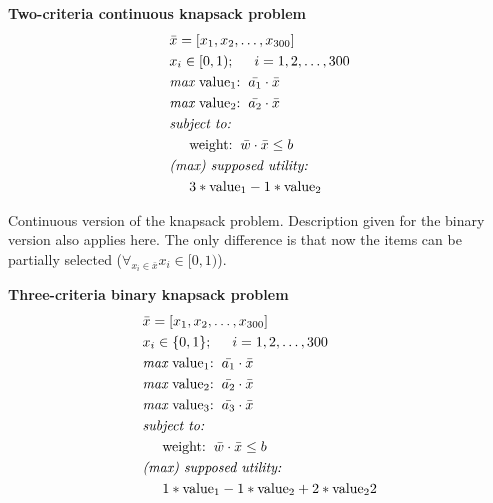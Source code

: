 \begin{description}
  \item{\textbf{Two-criteria continuous knapsack problem}}
    \begin{align*}
      & \bar{x} = [x_1, x_2, \dots, x_{300}]  \\
      & x_i \in [0, 1);  \hspace{0.5cm} i = 1, 2, \dots, 300 \\
      & \textit{max}\text{ value$_1$:} \hspace{0.2cm} \bar{a_1} \cdot \bar{x} \\
      & \textit{max}\text{ value$_2$:} \hspace{0.2cm} \bar{a_2} \cdot \bar{x} \\
      & \textit{subject to:} \\
      & \hspace{0.5cm} \text{weight:}  \hspace{0.2cm} \bar{w} \cdot \bar{x}
        \leq b \\
      & \textit{(max) supposed utility:} \\
      & \hspace{0.5cm} 3 * \text{value}_1 - 1 * \text{value}_2
    \end{align*}

    Continuous version of the knapsack problem. Description given for the
    binary version also applies here. The only difference is that now the
    items can be partially selected ($\forall_{x_i \in \bar{x}} x_i \in [0,
      1)$).

  \item{\textbf{Three-criteria binary knapsack problem}}
    \begin{align*}
      & \bar{x} = [x_1, x_2, \dots, x_{300}]  \\
      & x_i \in \{0, 1\};  \hspace{0.5cm} i = 1, 2, \dots, 300 \\
      & \textit{max}\text{ value$_1$:} \hspace{0.2cm} \bar{a_1} \cdot \bar{x} \\
      & \textit{max}\text{ value$_2$:} \hspace{0.2cm} \bar{a_2} \cdot \bar{x} \\
      & \textit{max}\text{ value$_3$:} \hspace{0.2cm} \bar{a_3} \cdot \bar{x} \\
      & \textit{subject to:} \\
      & \hspace{0.5cm} \text{weight:} \hspace{0.2cm} \bar{w} \cdot \bar{x}
      \leq b \\
      & \textit{(max) supposed utility:} \\
      & \hspace{0.5cm} 1 * \text{value}_1 - 1 * \text{value}_2 + 2 * \text{value}_22
    \end{align*}


\end{description}
